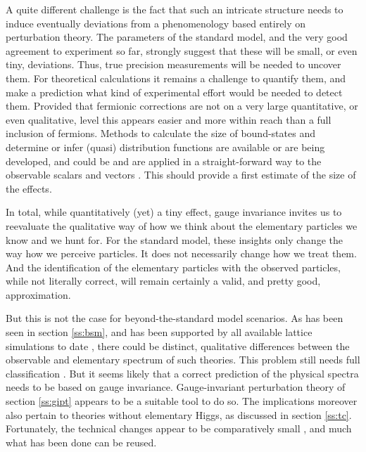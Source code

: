 \documentclass[final,twoside,12pt]{article}
\newcommand*{\1}{1\!\!\!\bot}
\begin{document}
A quite different challenge is the fact that such an intricate structure needs to induce eventually deviations from a phenomenology based entirely on perturbation theory. The parameters of the standard model, and the very good agreement to experiment so far, strongly suggest that these will be small, or even tiny, deviations. Thus, true precision measurements will be needed to uncover them. For theoretical calculations it remains a challenge to quantify them, and make a prediction what kind of experimental effort would be needed to detect them. Provided that fermionic corrections are not on a very large quantitative, or even qualitative, level this appears easier and more within reach than a full inclusion of fermions. Methods to calculate the size of bound-states \cite{Koponen:2015tkr,Gockeler:2003ay} and determine or infer (quasi) distribution functions \cite{Nguyen:2011jy,Lin:2014zya,Chen:2016utp,Nocera:2017war,Lin:2017snn,Gao:2017yyd} are available or are being developed, and could be and are applied in a straight-forward way to the observable scalars and vectors \cite{Egger:2017tkd,Raubitzek:unpublished,Fernbach:unpublished}. This should provide a first estimate of the size of the effects.

In total, while quantitatively (yet) a tiny effect, gauge invariance invites us to reevaluate the qualitative way of how we think about the elementary particles we know and we hunt for. For the standard model, these insights only change the way how we perceive particles. It does not necessarily change how we treat them. And the identification of the elementary particles with the observed particles, while not literally correct, will remain certainly a valid, and pretty good, approximation.

But this is not the case for beyond-the-standard model scenarios. As has been seen in section \ref{ss:bsm}, and has been supported by all available lattice simulations to date \cite{Maas:2016ngo,Lee:1985yi,Maas:unpublishedtoerek}, there could be distinct, qualitative differences between the observable and elementary spectrum of such theories. This problem still needs full classification \cite{Maas:2017xzh}. But it seems likely that a correct prediction of the physical spectra needs to be based on gauge invariance. Gauge-invariant perturbation theory of section \ref{ss:gipt} appears to be a suitable tool to do so. The implications moreover also pertain to theories without elementary Higgs, as discussed in section \ref{ss:tc}. Fortunately, the technical changes appear to be comparatively small \cite{Maas:2017xzh}, and much what has been done can be reused.
\end{document}
